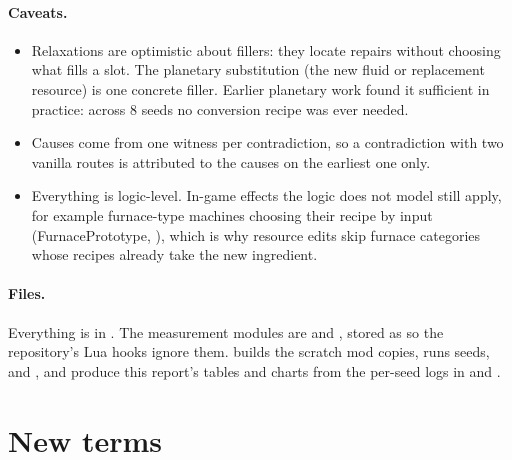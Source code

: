 \paragraph{Caveats.}
\begin{itemize}[nosep]
\item Relaxations are optimistic about fillers: they locate repairs without choosing what fills a slot. The planetary substitution (the new fluid or replacement resource) is one concrete filler. Earlier planetary work found it sufficient in practice: across 8 seeds no conversion recipe was ever needed.
\item Causes come from one witness per contradiction, so a contradiction with two vanilla routes is attributed to the causes on the earliest one only.
\item Everything is logic-level. In-game effects the logic does not model still apply, for example furnace-type machines choosing their recipe by input (FurnacePrototype, ), which is why resource edits skip furnace categories whose recipes already take the new ingredient.
\end{itemize}

\paragraph{Files.} Everything is in . The measurement modules are  and , stored as  so the repository's Lua hooks ignore them.  builds the scratch mod copies,  runs seeds, and ,  and  produce this report's tables and charts from the per-seed logs in  and .

\section{New terms}\label{app:terms}


